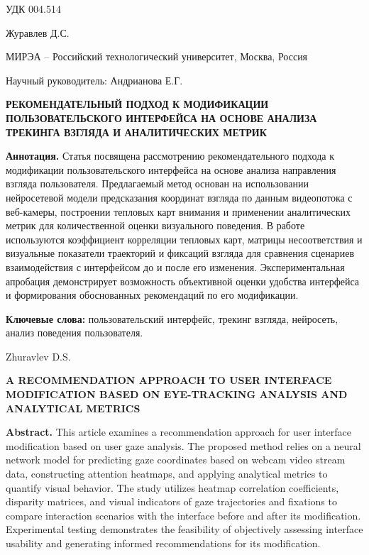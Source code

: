 \documentclass[12pt,a4paper]{article}
\begin{document}
\noindent УДК 004.514

\vspace{0.5cm}

Журавлев Д.С.

МИРЭА -- Российский технологический университет, Москва, Россия

Научный руководитель: Андрианова Е.Г.

\vspace{0.5cm}

\begin{center}
\textbf{
РЕКОМЕНДАТЕЛЬНЫЙ ПОДХОД К МОДИФИКАЦИИ
ПОЛЬЗОВАТЕЛЬСКОГО ИНТЕРФЕЙСА НА ОСНОВЕ
АНАЛИЗА ТРЕКИНГА ВЗГЛЯДА И АНАЛИТИЧЕСКИХ МЕТРИК
}
\end{center}

\vspace{0.3cm}

\noindent
\textbf{Аннотация.}
Статья посвящена рассмотрению рекомендательного подхода к модификации
пользовательского интерфейса на основе анализа направления взгляда пользователя.
Предлагаемый метод основан на использовании нейросетевой модели предсказания
координат взгляда по данным видеопотока с веб-камеры, построении тепловых карт
внимания и применении аналитических метрик для количественной оценки визуального
поведения. В работе используются коэффициент корреляции тепловых карт, матрицы
несоответствия и визуальные показатели траекторий и фиксаций взгляда для сравнения
сценариев взаимодействия с интерфейсом до и после его изменения. Экспериментальная
апробация демонстрирует возможность объективной оценки удобства интерфейса и
формирования обоснованных рекомендаций по его модификации.

\vspace{0.3cm}

\noindent
\textbf{Ключевые слова:}
пользовательский интерфейс, трекинг взгляда, нейросеть,
анализ поведения пользователя.

\vspace{0.8cm}

\noindent
Zhuravlev D.S.

\vspace{0.3cm}

\begin{center}
\textbf{
A RECOMMENDATION APPROACH TO USER INTERFACE MODIFICATION
BASED ON EYE-TRACKING ANALYSIS AND ANALYTICAL METRICS
}
\end{center}

\vspace{0.3cm}

\noindent
\textbf{Abstract.}
This article examines a recommendation approach for user interface modification
based on user gaze analysis. The proposed method relies on a neural network model
for predicting gaze coordinates based on webcam video stream data, constructing
attention heatmaps, and applying analytical metrics to quantify visual behavior.
The study utilizes heatmap correlation coefficients, disparity matrices, and visual
indicators of gaze trajectories and fixations to compare interaction scenarios with
the interface before and after its modification. Experimental testing demonstrates
the feasibility of objectively assessing interface usability and generating informed
recommendations for its modification.
\end{document}
